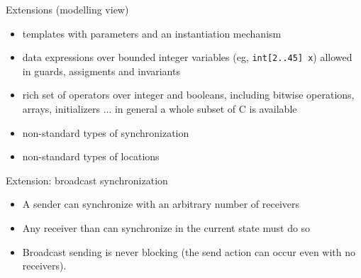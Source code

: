 \documentclass{beamer}
\def\dgold#1{{\darkgoldenrod #1}}
\def\dkb#1{{\blue #1}}
\begin{document}
\begin{slide}{Extensions (modelling view)}
\small

\begin{itemize}
\item \dkb{templates} with \dgold{parameters} and an \dgold{instantiation mechanism}
\item \dkb{data expressions} over \dkb{bounded integer variables} (eg, \texttt{int[2..45] x}) allowed in \dgold{guards},
\dgold{assigments} and \dgold{invariants}
\item rich set of \dkb{operators} over integer and booleans, including bitwise operations, arrays, initializers ... in general
a whole \dkb{subset of C} is available
\item \dkb{non-standard} types of \dgold{synchronization}
 \item \dkb{non-standard} types of \dgold{locations}
\end{itemize}
\end{slide}




\begin{slide}{Extension: broadcast synchronization}
\small



\begin{itemize}
\item A sender  can synchronize with an arbitrary number of receivers 
\item Any receiver than can synchronize in the current state must do so
\item Broadcast sending is never blocking (the send action can occur even with no receivers).
\end{itemize}

\end{slide}
\end{document}
